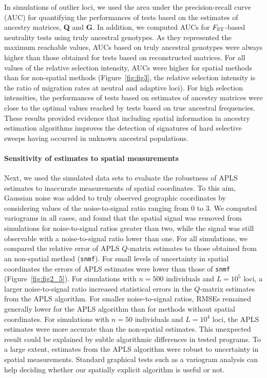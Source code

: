 In simulations of outlier loci, we used the area under the precision-recall
curve (AUC) for quantifying the performances of tests based on the estimates of
ancestry matrices, {\bf Q} and {\bf G}. In addition, we computed AUCs for
$F_{\rm ST}$-based neutrality tests using truly ancestral genotypes. As they
represented the maximum reachable values, AUCs based on truly ancestral
genotypes were always higher than those obtained for tests based on
reconstructed matrices. For all values of the relative selection intensity, AUCs
were higher for spatial methods than for non-spatial methods (Figure~\ref{fig:fig3}, the
relative selection intensity is the ratio of migration rates at neutral and
adaptive loci). For high selection intensities, the performances of tests based
on estimates of ancestry matrices were close to the optimal values reached by
tests based on true ancestral frequencies. These results provided evidence that
including spatial information in ancestry estimation algorithms improves the
detection of signatures of hard selective sweeps having occurred in unknown
ancestral populations.

\paragraph{Sensitivity of estimates to spatial measurements} Next, we used the
simulated data sets to evaluate the robustness of APLS estimates to inaccurate
measurements of spatial coordinates. To this aim, Gaussian noise was added to
truly observed geographic coordinates by considering values of the
noise-to-signal ratio ranging from 0 to 3. We computed variograms in all cases,
and found that the spatial signal was removed from simulations for
noise-to-signal ratios greater than two, while the signal was still observable
with a noise-to-signal ratio lower than one. For all simulations, we compared
the relative error of APLS $Q$-matrix estimates to those obtained from an
non-spatial method ({\tt snmf}). For small levels of uncertainty in spatial
coordinates the errors of APLS estimates were lower than those of {\tt snmf}
(Figure~\ref{fig:fig2_5}). For simulations with $n = 500$ individuals and $L =
10^5$ loci, a larger noise-to-signal ratio increased statistical errors in the
$Q$-matrix estimates from the APLS algorithm. For smaller noise-to-signal ratios,
RMSEs remained generally lower for the APLS algorithm than for methods without
spatial coordinates. For simulations with $n = 50$ individuals and $L = 10^4$
loci, the APLS estimates were more accurate than the non-spatial estimates. This
unexpected result could be explained by subtle algorithmic differences in tested
programs. To a large extent, estimates from the APLS algorithm were robust to
uncertainty in spatial measurements. Standard graphical tests such as a
variogram analysis can help deciding whether our spatially explicit algorithm is
useful or not.


